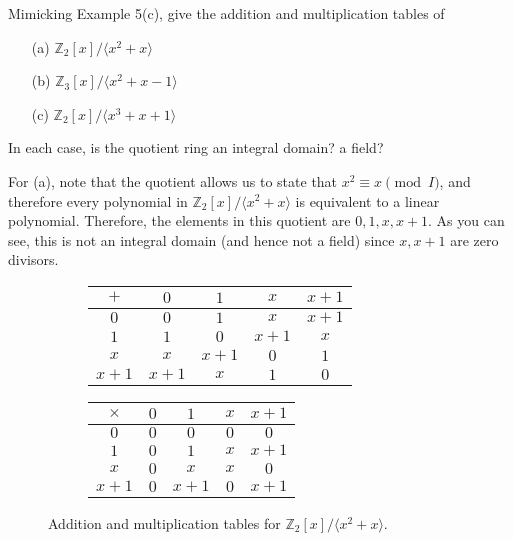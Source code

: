   \begin{exercise}[Shifrin 4.1.14.a/b]
    Mimicking Example 5(c), give the addition and multiplication tables of
    \begin{enumerate}
      \item[(a)] $\mathbb{Z}_2[x]/\langle x^2 + x \rangle$
      \item[(b)] $\mathbb{Z}_3[x]/\langle x^2 + x - 1 \rangle$
      \item[(c)] $\mathbb{Z}_2[x]/\langle x^3 + x + 1 \rangle$
    \end{enumerate}
    In each case, is the quotient ring an integral domain? a field?
  \end{exercise}
  \begin{solution}
    For (a), note that the quotient allows us to state that $x^2 \equiv x \pmod{I}$, and therefore every polynomial in $\mathbb{Z}_2 [x]/ \langle x^2 + x \rangle$ is equivalent to a linear polynomial. Therefore, the elements in this quotient are $0, 1, x, x + 1$. As you can see, this is not an integral domain (and hence not a field) since $x, x + 1$ are zero divisors. 

    \begin{figure}[H]
      \centering
      \begin{subfigure}[b]{0.48\textwidth}
        \centering
        \begin{tabular}{c|cccc}
          $+$ & $0$ & $1$ & $x$ & $x+1$ \\
          \hline
          $0$ & $0$ & $1$ & $x$ & $x+1$ \\
          $1$ & $1$ & $0$ & $x+1$ & $x$ \\
          $x$ & $x$ & $x+1$ & $0$ & $1$ \\
          $x+1$ & $x+1$ & $x$ & $1$ & $0$ \\
        \end{tabular}
      \end{subfigure}
      \hfill 
      \begin{subfigure}[b]{0.48\textwidth}
        \centering
        \begin{tabular}{c|cccc}
          $\times$ & $0$ & $1$ & $x$ & $x+1$ \\
          \hline
          $0$ & $0$ & $0$ & $0$ & $0$ \\
          $1$ & $0$ & $1$ & $x$ & $x+1$ \\
          $x$ & $0$ & $x$ & $x$ & $0$ \\
          $x+1$ & $0$ & $x+1$ & $0$ & $x+1$ \\
        \end{tabular}
      \end{subfigure}
      \caption{Addition and multiplication tables for $\mathbb{Z}_2 [x]/ \langle x^2 + x \rangle$. }
    \end{figure}


\end{solution}
